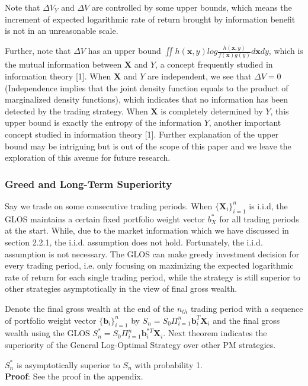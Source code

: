 \documentclass{gapd}
\begin{document}
Note that $\Delta V_Y$ and $\Delta V$ are controlled by some upper bounds, which means the increment of expected logarithmic rate of return brought by information benefit is not in an unreasonable scale. 

Further, note that $\Delta V$ has an upper bound $\iint{h(\textbf{x},y)log\frac{h(\textbf{x},y)}{f(\textbf{x})g(y)}d\textbf{x}dy}$, which is the mutual information between $\textbf{X}$ and $Y$, a concept frequently studied in information theory [1]. When $\textbf{X}$ and $Y$ are independent, we see that $\Delta V=0$ (Independence implies that the joint density function equals to the product of marginalized density functions), which indicates that no information has been detected by the trading strategy. When $\textbf{X}$ is completely determined by $Y$, this upper bound is exactly the entropy of the information $Y$, another important concept studied in information theory [1]. Further explanation of the upper bound may be intriguing but is out of the scope of this paper and we leave the exploration of this avenue for future research.

\subsubsection{Greed and Long-Term Superiority}

Say we trade on some consecutive trading periods. When $\{\textbf{X}_i\}_{i=1}^n$ is i.i.d, the GLOS maintains a certain fixed portfolio weight vector $b_X^*$ for all trading periods at the start. While, due to the market information which we have discussed in section 2.2.1, the i.i.d. assumption does not hold. Fortunately, the i.i.d. assumption is not necessary. The GLOS can make greedy investment decision for every trading period, i.e. only focusing on maximizing the expected logarithmic rate of return for each single trading period, while the strategy is still superior to other strategies asymptotically in the view of final gross wealth. 

Denote the final gross wealth at the end of the $n_{th}$ trading period with a sequence of portfolio weight vector $\{\textbf{b}_i\}_{i=1}^n$ by $S_n=S_0\Pi_{i=1}^{n}\textbf{b}_i^T\textbf{X}_i$ and the final gross wealth using the GLOS $S_n^*=S_0\Pi_{i=1}^{n}\textbf{b}_i^{*T}\textbf{X}_i$. Next theorem indicates the superiority of the General Log-Optimal Strategy over other PM strategies.

\begin{theorem}
$S_n^*$ is asymptotically superior to $S_n$ with probability 1.\\
\textbf{Proof}: See the proof in the appendix.
\end{theorem}
\end{document}
